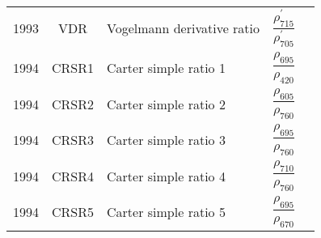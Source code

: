 \documentclass[10pt]{article}
\begin{document}
\begin{ThreePartTable}
\begin{longtable}{c c m{2.80in} M{2.80in} M{1.5in}}
  1993 & VDR     & Vogelmann derivative ratio                                                     & $\dfrac{\rho^\prime_{715}}{\rho^\prime_{705}}$                                                                                                                                                                                                                                          & \citet{Vogelmann1993}                               \\
  1994 & CRSR1   & Carter simple ratio 1                                                          & $\dfrac{\rho_{695}}{\rho_{420}}$                                                                                                                                                                                                                                                        & \citet{Carter1994}                                  \\
  1994 & CRSR2   & Carter simple ratio 2                                                          & $\dfrac{\rho_{605}}{\rho_{760}}$                                                                                                                                                                                                                                                        & \citet{Carter1994}                                  \\
  1994 & CRSR3   & Carter simple ratio 3                                                          & $\dfrac{\rho_{695}}{\rho_{760}}$                                                                                                                                                                                                                                                        & \citet{Carter1994}                                  \\
  1994 & CRSR4   & Carter simple ratio 4                                                          & $\dfrac{\rho_{710}}{\rho_{760}}$                                                                                                                                                                                                                                                        & \citet{Carter1994}                                  \\
  1994 & CRSR5   & Carter simple ratio 5                                                          & $\dfrac{\rho_{695}}{\rho_{670}}$                                                                                                                                                                                                                                                        & \citet{Carter1994}                                  \\

\end{longtable}
\end{ThreePartTable}
\end{document}
